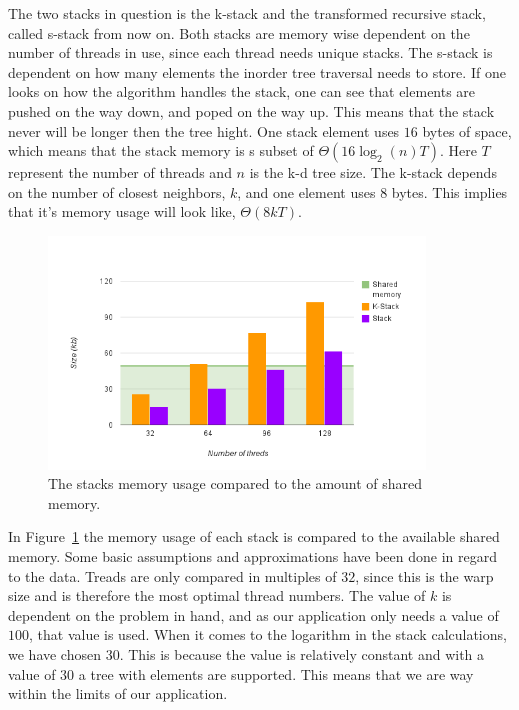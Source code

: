 The two stacks in question is the k-stack and the transformed recursive stack, called s-stack from now on. Both stacks are memory wise dependent on the number of threads in use, since each thread needs unique stacks. The s-stack is dependent on how many elements the inorder tree traversal needs to store. If one looks on how the algorithm handles the stack, one can see that elements are pushed on the way down, and poped on the way up.  This means that the stack never will be longer then the tree hight. One stack element uses $16$ bytes of space, which means that the stack memory is s subset of $\Theta(16\log_2(n)T)$. Here $T$ represent the number of threads and $n$ is the k-d tree size. The k-stack depends on the number of closest neighbors, $k$, and one element uses $8$ bytes. This implies that it's memory usage will look like, $\Theta(8kT)$.


\begin{figure}[ht!]
\centering
\includegraphics[width=100mm]{../gfx/shared_memory_and_stack.png}

\caption{The stacks memory usage compared to the amount of shared memory.}
\label{fig:stacks_and_shared_memory}
\end{figure}


In Figure~\ref{fig:stacks_and_shared_memory} the memory usage of each stack is compared to the available shared memory. Some basic assumptions and approximations have been done in regard to the data. Treads are only compared in multiples of $32$, since this is the warp size and is therefore the most optimal thread numbers. The value of $k$ is dependent on the problem in hand, and as our application only needs a value of $100$, that value is used. When it comes to the logarithm in the stack calculations, we have chosen $30$.  This is because the value is relatively constant and with a value of $30$ a tree with  elements are supported. This means that we are way within the limits of our application.


